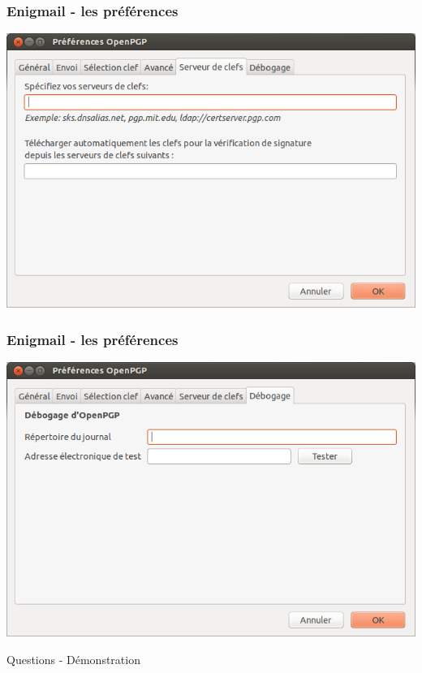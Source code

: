 \documentclass{beamer}
\begin{document}
\begin{frame}
\frametitle{Enigmail - les préférences}
\begin{center}
\includegraphics[scale=0.3] {./images/Enigmail06.png}
\end{center}
\end{frame}

\begin{frame}
\frametitle{Enigmail - les préférences}
\begin{center}
\includegraphics[scale=0.3] {./images/Enigmail07.png}
\end{center}
\end{frame}

\begin{frame}
\begin{center}
\Huge{Questions - Démonstration }
\end{center}
\end{frame}
\end{document}
